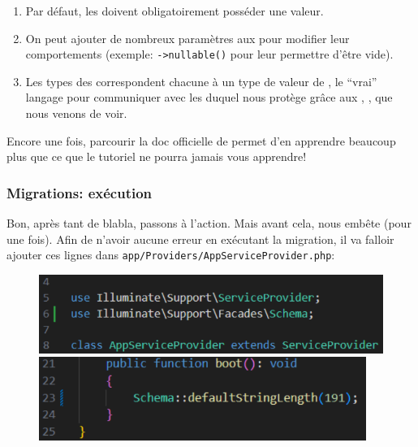 \begin{enumerate}
    \item Par défaut, les \columns{} doivent obligatoirement posséder une valeur.
    \item On peut ajouter de nombreux paramètres aux \columns{} pour modifier leur comportements (exemple: \verb|->nullable()| pour leur permettre d'être vide).
    \item Les types des \column{} correspondent chacune à un type de valeur de \mysql{}, le ``vrai'' langage pour communiquer avec les \db{} duquel \laravel{} nous protège grâce aux \models{}, \migrations{}, \tables{} que nous venons de voir.
\end{enumerate}

Encore une fois, parcourir la doc officielle de \laravel{} permet d'en apprendre beaucoup plus que ce que le tutoriel ne pourra jamais vous apprendre!

\subsubsection[Migrations: exécution]{Migrations: exécution}

Bon, après tant de blabla, passons à l'action. Mais avant cela, \laravel{} nous embête (pour une fois). Afin de n'avoir aucune erreur en exécutant la migration, il va falloir ajouter ces lignes dans \verb|app/Providers/AppServiceProvider.php|:

\begin{figure}[!h]
    \centering
    \begin{minipage}{0.49\textwidth}
         \centering
         \includegraphics[width=\textwidth]{figures-C1/appservice_2.pdf}
    \end{minipage}
    \begin{minipage}{0.49\textwidth}
         \centering
         \includegraphics[width=0.95\textwidth]{figures-C1/appservice_1.pdf}
    \end{minipage}
\end{figure}


